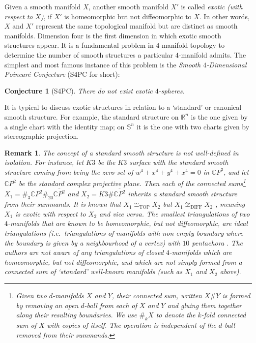 \documentclass[pdflatex,sn-mathphys-num]{sn-jnl}
\theoremstyle{thmstyleone}%
\theoremstyle{thmstyletwo}%
\newtheorem{remark}{Remark}%
\newtheorem{conjecture}{Conjecture}%
\theoremstyle{thmstylethree}%
\newcommand{\cpp}{\mathbb{C}P^2}
\theoremstyle{remark}
\begin{document}
Given a smooth manifold $X$, another smooth manifold $X'$ is called {\em exotic (with respect to $X$)}, if $X'$ is homeomorphic but not diffeomorphic to $X$. In other words, $X$ and $X'$ represent the same topological manifold but are distinct as smooth manifolds. Dimension four is the first dimension in which exotic smooth structures appear. It is a fundamental problem in $4$-manifold topology to determine the number of smooth structures a particular $4$-manifold admits. The simplest and most famous instance of this problem is the \emph{Smooth $4$-Dimensional Poincar\'e Conjecture} (S4PC for short):

    \begin{conjecture}[S4PC]
        There do not exist exotic $4$-spheres.
    \end{conjecture}

It is typical to discuss exotic structures in relation to a `standard' or canonical smooth structure. For example, the standard structure on $\mathbb{R}^n$ is the one given by a single chart with the identity map; on $\mathbb{S}^n$ it is the one with two charts given by stereographic projection.

\begin{remark}
The concept of a standard smooth structure is not well-defined in isolation. For instance, let $K3$ be the {\em $K3$ surface} with the standard smooth structure coming from being the zero-set of $w^4+x^4+y^4+x^4=0$ in $\mathbb{C}P^3$, and let $\mathbb{C}P^2$ be the standard complex projective plane. Then each of the connected sums\footnote{Given two $d$-manifolds $X$ and $Y$, their {\em connected sum}, written $X\# Y$ is formed by removing an open $d$-ball from each of $X$ and $Y$ and gluing them together along their resulting boundaries. We use $\#_k X$ to denote the $k$-fold connected sum of $X$ with copies of itself. The operation is independent of the $d$-ball removed from their summands.} $X_1 = \#_{3} \cpp \#_{20} \overline{\cpp}$ and $X_2 = K3 \# \overline{\cpp}$ inherits a standard smooth structure from their summands. It is known that $X_1\cong_{\mathrm{TOP}}X_2$ but $X_1\not\cong_{\mathrm{DIFF}}X_2$ \cite{kronheimerMrowka-K3CP2}, meaning $X_1$ is exotic with respect to $X_2$ and vice versa. The smallest triangulations of two $4$-manifolds that are known to be homeomorphic, but not diffeomorphic, are {\em ideal triangulations} (i.e.\ triangulations of manifolds with non-empty boundary where the boundary is given by a neighbourhood of a vertex) with $10$ pentachora \cite{Burke-SoftwareJoCGver}. The authors are not aware of any triangulations of closed $4$-manifolds which are homeomorphic, but not diffeomorphic, and which are not simply formed from a connected sum of ‘standard’ well-known manifolds (such as $X_1$ and $X_2$ above). 
\end{remark}
\end{document}
